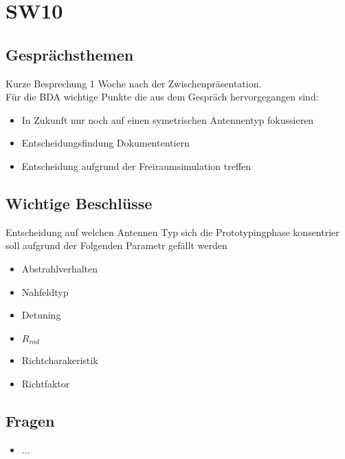 \documentclass[10pt,a4paper]{article}
\begin{document}
\section*{SW10}

\subsection*{Gesprächsthemen}

Kurze Besprechung 1 Woche nach der Zwischenpräsentation.\\

\vspace{10 mm}
Für die BDA wichtige Punkte die aus dem Gespräch hervorgegangen sind:
\begin{itemize}
	\item In Zukunft nur noch auf einen symetrischen Antennentyp fokussieren
	\item Entscheidungsfindung Dokumententiern
	\item Entscheidung aufgrund der Freiraumsimulation treffen
	
\end{itemize}

\subsection*{Wichtige Beschlüsse}
Entscheidung auf welchen Antennen Typ sich die Prototypingphase konsentrier soll aufgrund der Folgenden Parametr gefällt werden
\begin{itemize}
	\item Abstrahlverhalten
	\item Nahfeldtyp
	\item Detuning 
	\item $R_{rad}$
	\item Richtcharakeristik
	\item Richtfaktor 
\end{itemize}
\subsection*{Fragen}
\begin{itemize}
	\item ...
\end{itemize}
\end{document}
